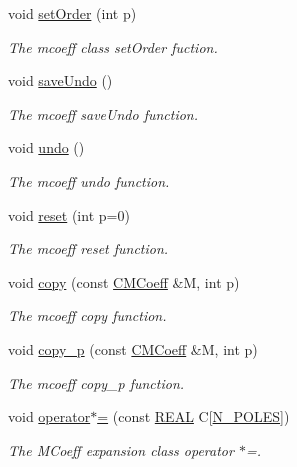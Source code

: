 \begin{DoxyCompactItemize}
void \hyperlink{classCMCoeff_a815a4d1f74b217ea54d9f05f6734004f}{set\-Order} (int p)
\begin{DoxyCompactList}\small\item\em The mcoeff class set\-Order fuction. \end{DoxyCompactList}\item 
void \hyperlink{classCMCoeff_a99771333750460a0ba9c97f03bdaa6b9}{save\-Undo} ()
\begin{DoxyCompactList}\small\item\em The mcoeff save\-Undo function. \end{DoxyCompactList}\item 
void \hyperlink{classCMCoeff_ae75856578c3de42f457cc6e2af17d1d4}{undo} ()
\begin{DoxyCompactList}\small\item\em The mcoeff undo function. \end{DoxyCompactList}\item 
void \hyperlink{classCMCoeff_a5fc4a2ee0ab437bd601fd67ccc5bd43b}{reset} (int p=0)
\begin{DoxyCompactList}\small\item\em The mcoeff reset function. \end{DoxyCompactList}\item 
void \hyperlink{classCMCoeff_a7010837883b56f9b972888bffb6fbb3d}{copy} (const \hyperlink{classCMCoeff}{C\-M\-Coeff} \&M, int p)
\begin{DoxyCompactList}\small\item\em The mcoeff copy function. \end{DoxyCompactList}\item 
void \hyperlink{classCMCoeff_aba7b82a12360b0789af87a8dda74863b}{copy\-\_\-p} (const \hyperlink{classCMCoeff}{C\-M\-Coeff} \&M, int p)
\begin{DoxyCompactList}\small\item\em The mcoeff copy\-\_\-p function. \end{DoxyCompactList}\item 
void \hyperlink{classCMCoeff_a63d33423be766832461e5e20a0f21f66}{operator$\ast$=} (const \hyperlink{util_8h_a5821460e95a0800cf9f24c38915cbbde}{R\-E\-A\-L} C\mbox{[}\hyperlink{mcoeff_8h_ac23f9c13c5d07d9ce386f7a830c35e5a}{N\-\_\-\-P\-O\-L\-E\-S}\mbox{]})
\begin{DoxyCompactList}\small\item\em The M\-Coeff expansion class operator $\ast$=. \end{DoxyCompactList}\item 

\end{DoxyCompactItemize}
